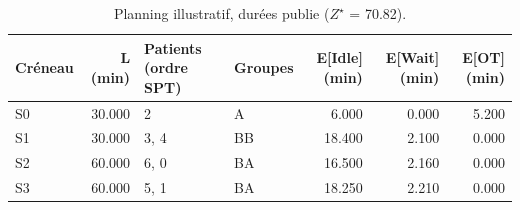 \begin{table}[htbp]
\caption{Planning illustratif, durées publie ($Z^\star$ = 70.82).}
\label{tab:planning-publie}
\begin{tabular}{lrllrrr}
\toprule
Créneau & L (min) & Patients (ordre SPT) & Groupes & E[Idle] (min) & E[Wait] (min) & E[OT] (min) \\
\midrule
S0 & 30.000 & 2 & A & 6.000 & 0.000 & 5.200 \\
S1 & 30.000 & 3, 4 & BB & 18.400 & 2.100 & 0.000 \\
S2 & 60.000 & 6, 0 & BA & 16.500 & 2.160 & 0.000 \\
S3 & 60.000 & 5, 1 & BA & 18.250 & 2.210 & 0.000 \\
\bottomrule
\end{tabular}
\end{table}
